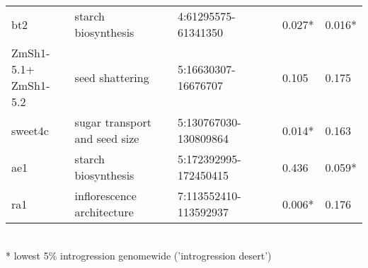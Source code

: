 \begin{sidewaystable}[ht]
\begin{tabular}{llllll}
  bt2 & starch biosynthesis & \cite{Whitt:2002_starch} & 4:61295575-61341350 & 0.027* & 0.016* \\ 
  \makecell[tl]{ZmSh1-5.1+\\ZmSh1-5.2} & seed shattering & \cite{Lin:2012_shattering} & 5:16630307-16676707 & 0.105 & 0.175 \\ 
  sweet4c & \makecell[tl]{sugar transport\\ and seed size} & \cite{Sosso:2015} & 5:130767030-130809864 & 0.014* & 0.163 \\ 
  ae1 & starch biosynthesis & \cite{Whitt:2002_starch} & 5:172392995-172450415 & 0.436 & 0.059* \\ 
  ra1 & \makecell[tl]{inflorescence\\ architecture} & \cite{Vollbrecht:2005_ramosa, Sigmon_Vollbrecht:2010} & 7:113552410-113592937 & 0.006* & 0.176 \\ 
   \hline
\end{tabular}
\\
 * lowest 5\% introgression genomewide ('introgression desert')
\end{sidewaystable}
